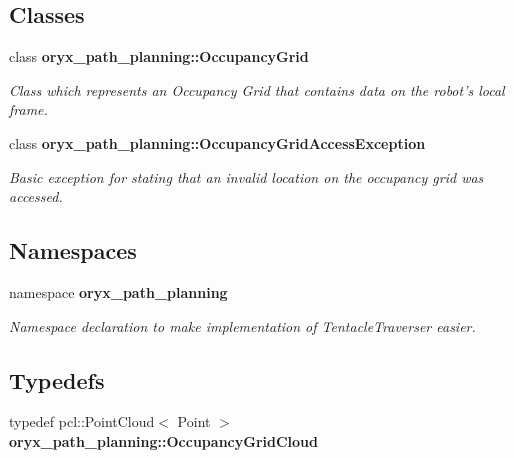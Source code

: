 \subsection*{\-Classes}
\begin{DoxyCompactItemize}
\item 
class {\bf oryx\-\_\-path\-\_\-planning\-::\-Occupancy\-Grid}
\begin{DoxyCompactList}\small\item\em \-Class which represents an \-Occupancy \-Grid that contains data on the robot's local frame. \end{DoxyCompactList}\item 
class {\bf oryx\-\_\-path\-\_\-planning\-::\-Occupancy\-Grid\-Access\-Exception}
\begin{DoxyCompactList}\small\item\em \-Basic exception for stating that an invalid location on the occupancy grid was accessed. \end{DoxyCompactList}\end{DoxyCompactItemize}
\subsection*{\-Namespaces}
\begin{DoxyCompactItemize}
\item 
namespace {\bf oryx\-\_\-path\-\_\-planning}
\begin{DoxyCompactList}\small\item\em \-Namespace declaration to make implementation of \-Tentacle\-Traverser easier. \end{DoxyCompactList}\end{DoxyCompactItemize}
\subsection*{\-Typedefs}
\begin{DoxyCompactItemize}
\item 
typedef pcl\-::\-Point\-Cloud$<$ \-Point $>$ {\bf oryx\-\_\-path\-\_\-planning\-::\-Occupancy\-Grid\-Cloud}
\end{DoxyCompactItemize}
